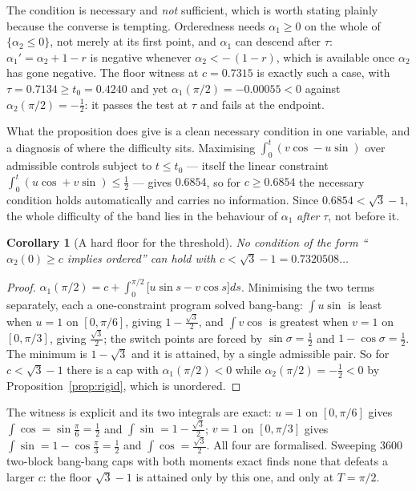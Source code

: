 \documentclass[11pt]{article}
\newtheorem{corollary}[theorem]{Corollary}
\theoremstyle{definition}
\begin{document}
The condition is necessary and \emph{not} sufficient, which is worth stating plainly
because the converse is tempting. Orderedness needs $\alpha_1\ge0$ on the whole of
$\{\alpha_2\le0\}$, not merely at its first point, and $\alpha_1$ can descend after $\tau$:
$\alpha_1'=\alpha_2+1-r$ is negative whenever $\alpha_2<-\,(1-r)$, which is available once
$\alpha_2$ has gone negative. The floor witness at $c=0.7315$ is exactly such a case, with
$\tau=0.7134\ge t_0=0.4240$ and yet $\alpha_1(\pi/2)=-0.00055<0$ against
$\alpha_2(\pi/2)=-\tfrac12$: it passes the test at $\tau$ and fails at the endpoint.

What the proposition does give is a clean necessary condition in one variable, and a
diagnosis of where the difficulty sits. Maximising
$\int_0^t(v\cos-u\sin)$ over admissible controls subject to $t\le t_0$ --- itself the
linear constraint $\int_0^t(u\cos+v\sin)\le\tfrac12$ --- gives $0.6854$, so for
$c\ge0.6854$ the necessary condition holds automatically and carries no information. Since
$0.6854<\sqrt3-1$, the whole difficulty of the band lies in the behaviour of $\alpha_1$
\emph{after} $\tau$, not before it.

\begin{corollary}[A hard floor for the threshold]\label{cor:floor}
No condition of the form ``$\alpha_2(0)\ge c$ implies ordered'' can hold with
$c<\sqrt3-1=0.7320508\ldots$
\end{corollary}

\begin{proof}
$\alpha_1(\pi/2)=c+\int_0^{\pi/2}\bigl[u\sin s-v\cos s\bigr]ds$. Minimising the two terms
separately, each a one-constraint program solved bang-bang:
$\int u\sin$ is least when $u=1$ on $[0,\pi/6]$, giving $1-\tfrac{\sqrt3}2$, and
$\int v\cos$ is greatest when $v=1$ on $[0,\pi/3]$, giving $\tfrac{\sqrt3}2$; the switch
points are forced by $\sin\sigma=\tfrac12$ and $1-\cos\sigma=\tfrac12$. The minimum is
$1-\sqrt3$ and it is attained, by a single admissible pair. So for $c<\sqrt3-1$ there is a
cap with $\alpha_1(\pi/2)<0$ while $\alpha_2(\pi/2)=-\tfrac12<0$ by
Proposition~\ref{prop:rigid}, which is unordered.
\end{proof}

The witness is explicit and its two integrals are exact: $u=1$ on $[0,\pi/6]$ gives
$\int\cos=\sin\tfrac\pi6=\tfrac12$ and $\int\sin=1-\tfrac{\sqrt3}2$; $v=1$ on $[0,\pi/3]$
gives $\int\sin=1-\cos\tfrac\pi3=\tfrac12$ and $\int\cos=\tfrac{\sqrt3}2$. All four are
formalised. Sweeping $3600$ two-block bang-bang caps with both moments exact finds none
that defeats a larger $c$: the floor $\sqrt3-1$ is attained only by this one, and only at
$T=\pi/2$.
\end{document}
